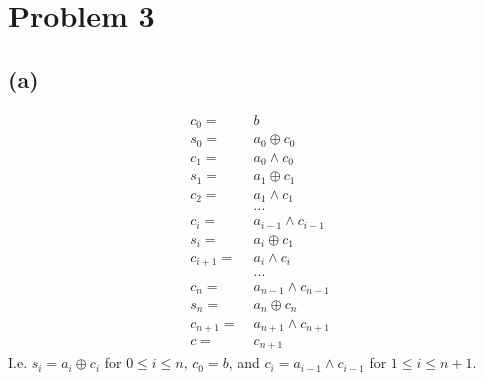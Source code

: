 \documentclass{article}
\begin{document}
\pagebreak

\section{Problem 3}
\subsection{(a)}
\begin{align*}
	c_0 = \;     & b                     \\
	s_0 = \;     & a_0 \oplus c_0        \\
	c_1 = \;     & a_0 \land c_0         \\
	s_1 = \;     & a_1 \oplus c_1        \\
	c_2 = \;     & a_1 \land c_1         \\
	             & ...                   \\
	c_i = \;     & a_{i-1} \land c_{i-1} \\
	s_i = \;     & a_i \oplus c_1        \\
	c_{i+1} = \; & a_i \land c_i         \\
	             & ...                   \\
	c_{n} = \;   & a_{n-1} \land c_{n-1} \\
	s_n = \;     & a_n \oplus c_n        \\
	c_{n+1} = \; & a_{n+1} \land c_{n+1} \\
	c = \;       & c_{n+1}
\end{align*}
I.e. $s_i = a_i \oplus c_i$ for $0 \leq i \leq n$, $c_0 = b$, and $c_i = a_{i-1} \land c_{i-1}$ for $1 \leq i \leq n+1$.
\end{document}
